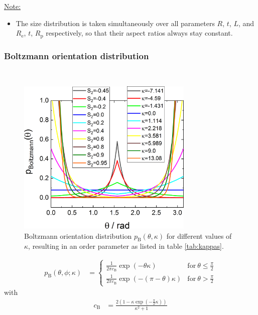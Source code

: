 \vspace{5mm}

\underline{Note:}
\begin{itemize}
\item The size distribution is taken simultaneously over all parameters $R$, $t$, $L$, and $R_\mathrm{e}$, $t$, $R_\mathrm{p}$ respectively, so that their aspect ratios always stay constant.
\end{itemize}

\newpage
\subsubsection{Boltzmann orientation distribution} ~\\

\begin{figure}[htb]
\includegraphics[width=0.75\textwidth]{../images/form_factor/cylindrical_obj/pBoltzmannGr.png}
\caption{Boltzmann orientation distribution $p_\mathrm{B}(\theta,\kappa)$ for different values of $\kappa$, resulting in an order parameter as listed in table \ref{tab:kappas}.}
\label{fig:pBoltzmannGr}
\end{figure}

\begin{align}
p_\mathrm{B}(\theta,\phi;\kappa) & =
\begin{cases}
\displaystyle
\frac{1}{2\pi c_\mathrm{B}}\exp\left(-\theta\kappa\right) & \mathrm{for~}  \theta \leq \frac{\pi}{2}\\[5mm]
\displaystyle
\frac{1}{2\pi c_\mathrm{B}}\exp\left(-(\pi-\theta)\kappa\right) & \mathrm{for~}  \theta > \frac{\pi}{2}
\end{cases}
\end{align}
with
\begin{align}
c_\mathrm{B} &= \frac{2\left(1-\kappa \exp\left(-\frac{\pi}{2}\kappa\right)\right)}{\kappa^2+1}
\end{align}

